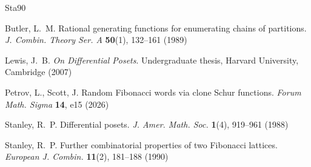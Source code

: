 \documentclass[11pt]{amsart}
\theoremstyle{remark}
\begin{document}
\begin{thebibliography}{Sta90}

Butler, L.~M.
Rational generating functions for enumerating chains of partitions.
\emph{J. Combin. Theory Ser. A} \textbf{50}(1), 132--161 (1989)

Lewis, J.~B.
\emph{On Differential Posets}.
Undergraduate thesis, Harvard University, Cambridge (2007)

Petrov, L., Scott, J.
Random Fibonacci words via clone Schur functions.
\emph{Forum Math. Sigma} \textbf{14}, e15 (2026)

Stanley, R.~P.
Differential posets.
\emph{J. Amer. Math. Soc.} \textbf{1}(4), 919--961 (1988)

Stanley, R.~P.
Further combinatorial properties of two Fibonacci lattices.
\emph{European J. Combin.} \textbf{11}(2), 181--188 (1990)

\end{thebibliography}
\end{document}
